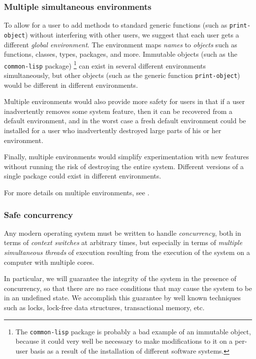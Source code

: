 \subsubsection{Multiple simultaneous environments}

To allow for a user to add methods to standard generic functions (such
as \texttt{print-object}) without interfering with other users, we
suggest that each user gets a different \emph{global environment}.
The environment maps \emph{names} to \emph{objects} such as functions,
classes, types, packages, and more.  Immutable objects (such as the
\texttt{common-lisp} package)%
\footnote{The \texttt{common-lisp} package is probably a bad example
  of an immutable object, because it could very well be necessary to
  make modifications to it on a per-user basis as a result of the
  installation of different software systems.}
can exist in several different
environments simultaneously, but other objects (such as the generic
function \texttt{print-object}) would be different in different
environments.

Multiple environments would also provide more safety for users in
that if a user inadvertently removes some system feature, then it
can be recovered from a default environment, and in the worst case a
fresh default environment could be installed for a user who
inadvertently destroyed large parts of his or her environment. 

Finally, multiple environments would simplify experimentation with
new features without running the risk of destroying the entire
system.  Different versions of a single package could exist in
different environments.

For more details on multiple environments, see
.

\subsubsection{Safe concurrency}

Any modern operating system must be written to handle
\emph{concurrency}, both in terms of \emph{context switches} at
arbitrary times, but especially in terms of \emph{multiple
  simultaneous threads} of execution resulting from the execution of
the system on a computer with multiple cores.

In particular, we will guarantee the integrity of the system in the
presence of concurrency, so that there are no race conditions that may
cause the system to be in an undefined state.  We accomplish this
guarantee by well known techniques such as locks, lock-free data
structures, transactional memory, etc.

